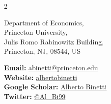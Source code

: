 \documentclass{resume} %
\begin{document}
	
	
	\vspace{-0.5cm}
\begin{multicols}{2}
	\raggedright %
	Department of Economics, \\
	Princeton University, \\
	Julis Romo Rabinowitz Building, \\
	Princeton, NJ, 08544, US
	
	\columnbreak %
	
	\raggedleft %
	\textbf{Email:} \href{mailto:abinetti@princeton.edu}{abinetti@princeton.edu}\\
	\textbf{Website:}  \href{https://albertobinetti.github.io}{albertobinetti} \\
	\textbf{Google Scholar:} \href{https://scholar.google.com/citations?user=zUWmT7oAAAAJ&hl=en&oi=ao}{Alberto Binetti} \\
	\textbf{Twitter:} \href{https://twitter.com/Al_Bi99}{@Al\_Bi99} \\
\end{multicols}

\vspace{0.2cm}
	
\end{document}
